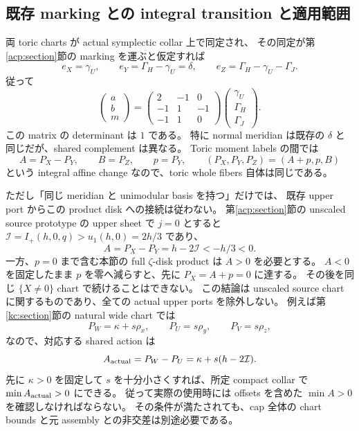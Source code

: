 \subsection{既存 marking との integral transition と適用範囲}

両 toric charts が actual symplectic collar 上で同定され、
その同定が第\ref{acp:section}節の marking を運ぶと仮定すれば
\[
 e_X=\gamma_U,\qquad e_Y=\Gamma_H-\gamma_U=\delta,
 \qquad e_Z=\Gamma_H-\gamma_U-\Gamma_J.
\]
従って
\begin{equation}\label{mft:marked-transition}
 \begin{pmatrix}a\\b\\m\end{pmatrix}
 =
 \begin{pmatrix}2&-1&0\\-1&1&-1\\-1&1&0\end{pmatrix}
 \begin{pmatrix}\gamma_U\\\Gamma_H\\\Gamma_J\end{pmatrix}.
\end{equation}
この matrix の determinant は $1$ である。
特に normal meridian は既存の $\delta$ と同じだが、shared complement は異なる。
Toric moment labels の間では
\[
 A=P_X-P_Y,\qquad B=P_Z,\qquad p=P_Y,
 \qquad (P_X,P_Y,P_Z)=(A+p,p,B)
\]
という integral affine change なので、toric whole fibers 自体は同じである。

ただし「同じ meridian と unimodular basis を持つ」だけでは、
既存 upper port からこの product disk への接続は従わない。
第\ref{acp:section}節の unscaled source prototype の upper sheet で $j=0$ とすると
$\mathcal I=I_+(h,0,q)>u_1(h,0)=2h/3$ であり、
\begin{equation}\label{mft:upper-sign}
 A=P_X-P_Y=h-2\mathcal I<-h/3<0.
\end{equation}
一方、$p=0$ まで含む本節の full $\zeta$-disk product は $A>0$ を必要とする。
$A<0$ を固定したまま $p$ を零へ減らすと、先に $P_X=A+p=0$ に達する。
その後を同じ $\{X\ne0\}$ chart で続けることはできない。
この結論は unscaled source chart に関するものであり、全ての actual upper ports を除外しない。
例えば第\ref{kc:section}節の natural wide chart では
\[
 P_W=\kappa+s\rho_x,\qquad P_U=s\rho_y,\qquad P_V=s\rho_z,
\]
なので、対応する shared action は
\[
 A_{\rm actual}=P_W-P_U=\kappa+s(h-2\mathcal I).
\]
先に $\kappa>0$ を固定して $s$ を十分小さくすれば、所定 compact collar で
$\min A_{\rm actual}>0$ にできる。
従って実際の使用時には offsets を含めた $\min A>0$ を確認しなければならない。
その条件が満たされても、cap 全体の chart bounds と元 assembly との非交差は別途必要である。

